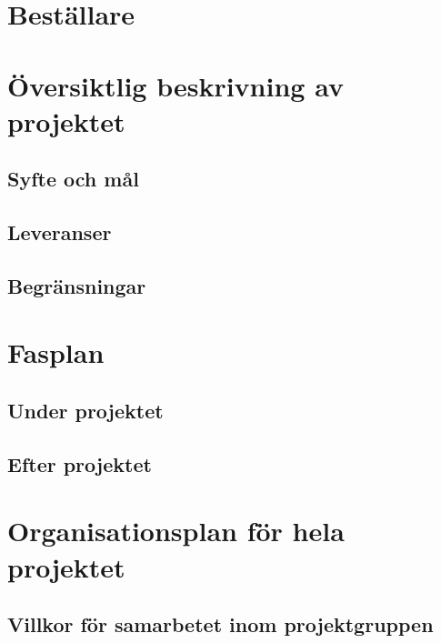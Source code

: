 \documentclass[11pt]{article}
\begin{document}
\pagebreak


\begin{flushleft}

\section{Beställare}

\pagebreak

\section{Översiktlig beskrivning av projektet}

\subsection{Syfte och mål}

\subsection{Leveranser}

\subsection{Begränsningar}

\pagebreak

\section{Fasplan}

\subsection{Under projektet}

\subsection{Efter projektet}

\pagebreak

\section{Organisationsplan för hela projektet}

\subsection{Villkor för samarbetet inom projektgruppen}


\end{flushleft}
\end{document}
